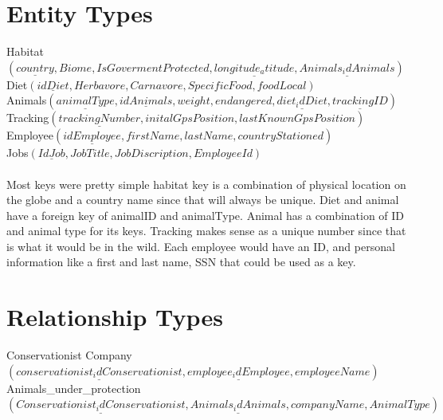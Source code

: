 \documentclass[11pt]{article}
\theoremstyle{plain}
\theoremstyle{definition}
\begin{document}
\section{Entity Types}
Habitat$(\underline{country }, Biome, IsGovermentProtected,\underline{ longitude_atitude},\underline{ Animals_idAnimals})$ \\

Diet$(\underline{ idDiet}, Herbavore, Carnavore, SpecificFood, foodLocal)$ \\ 

Animals$(\underline{ animalType}, \underline{ idAnimals}, weight, endangered, \underline{diet_idDiet}, \underline{ trackingID})$ \\

Tracking$(\underline{ trackingNumber}, initalGpsPosition, lastKnownGpsPosition)$ \\

Employee$(\underline{ idEmployee}, firstName, lastName, countryStationed)$ \\

Jobs$(\underline{ IdJob}, JobTitle, JobDiscription, EmployeeId)$ \\ \\
Most keys were pretty simple habitat key is a combination of physical location on the globe and a country name since that will always be unique. Diet and animal have a foreign key of animalID and animalType. Animal has a combination of ID and animal type for its keys. Tracking makes sense as a unique number since that is what it would be in the wild.
Each employee would have an ID, and personal information like a first and last name, SSN that could be used as a key.

\section{Relationship Types}
Conservationist Company $(\underline{ conservationist_idConservationist}, \underline{ employee_idEmployee}, employeeName)$ \\

Animals\_under\_protection$(\underline{Conservationist_idConservationist},\underline{Animals_idAnimals}, companyName, AnimalType)$\\ 
\end{document}
